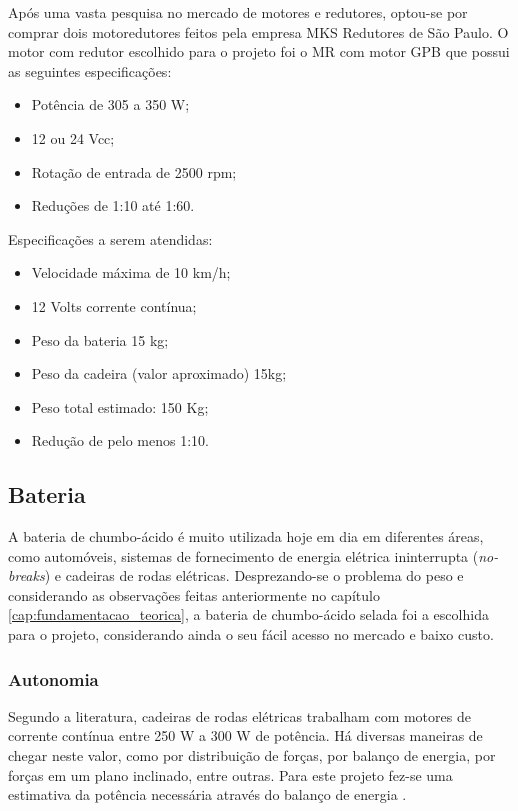   Após uma vasta pesquisa no mercado de motores e redutores, optou-se por comprar dois motoredutores feitos pela empresa MKS Redutores de São Paulo. O motor com redutor escolhido para o projeto foi o MR com motor GPB que possui as seguintes especificações:

	\begin{itemize}
		\item Potência de 305 a 350 W;
		\item 12 ou 24 Vcc;
		\item Rotação de entrada de 2500 rpm;
		\item Reduções de 1:10 até 1:60.
	\end{itemize}

	Especificações a serem atendidas:

	\begin{itemize}
		\item Velocidade máxima de 10 km/h;
		\item 12 Volts corrente contínua;
		\item Peso da bateria 15 kg;
		\item Peso da cadeira (valor aproximado) 15kg;
		\item Peso total estimado: 150 Kg;
		\item Redução de pelo menos 1:10.
	\end{itemize}

	\subsection{Bateria}

  A bateria de chumbo-ácido é muito utilizada hoje em dia em diferentes áreas, como automóveis, sistemas de fornecimento de energia elétrica ininterrupta (\textit{no-breaks}) e cadeiras de rodas elétricas. Desprezando-se o problema do peso e considerando as observações feitas anteriormente no capítulo \ref{cap:fundamentacao_teorica}, a bateria de chumbo-ácido selada foi a escolhida para o projeto, considerando ainda o seu fácil acesso no mercado e baixo custo.

	\subsubsection{Autonomia}

		Segundo a literatura, cadeiras de rodas elétricas trabalham com motores de corrente contínua entre 250 W a 300 W de potência. Há diversas maneiras de chegar neste valor, como por distribuição de forças, por balanço de energia, por forças em um plano inclinado, entre outras. Para este projeto fez-se uma estimativa da potência necessária através do balanço de energia \cite{acionamento_motores_cadeira}.


